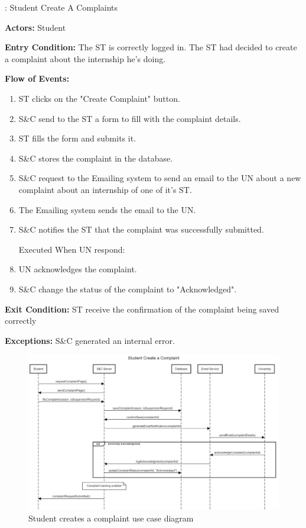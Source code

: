 
\nextUseCaseID: Student Create A Complaints

\par \textbf{Actors:} Student

\par \textbf{Entry Condition:} The ST is correctly logged in. The ST had decided to create a complaint about the internship he's doing.

\par \textbf{Flow of Events:}

\begin{enumerate}
    \item ST clicks on the "Create Complaint" button.
    \item S\&C send to the ST a form to fill with the complaint details.
    \item ST fills the form and submits it.
    \item S\&C stores the complaint in the database.
    \item S\&C request to the Emailing system to send an email to the UN about a new complaint about an internship of one of it's ST.
    \item The Emailing system sends the email to the UN.
    \item S\&C notifies the ST that the complaint was successfully submitted.

    Executed When UN respond:
    \item UN acknowledges the complaint.
    \item S\&C change the status of the complaint to "Acknowledged".
\end{enumerate}

\par \textbf{Exit Condition:} ST receive the confirmation of the complaint being saved correctly

\par \textbf{Exceptions:}  S\&C generated an internal error.

\begin{figure}[H]
    \centering
    \includegraphics[width=1.0\textwidth]{Images/UC_6.pdf}
    \caption{Student creates a complaint use case diagram}
    \label{fig:use-case-diagram-6}
\end{figure}


